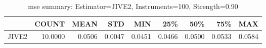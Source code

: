 \begin{table}[ht]
\centering
\caption{mse summary: Estimator=JIVE2, Instruments=100, Strength=0.90}
\begin{tabular}{lrrrrrrrr}
\toprule
 & COUNT & MEAN & STD & MIN & 25\% & 50\% & 75\% & MAX \\
\midrule
JIVE2 & 10.0000 & 0.0506 & 0.0047 & 0.0451 & 0.0466 & 0.0500 & 0.0533 & 0.0584 \\
\bottomrule
\end{tabular}
\end{table}
